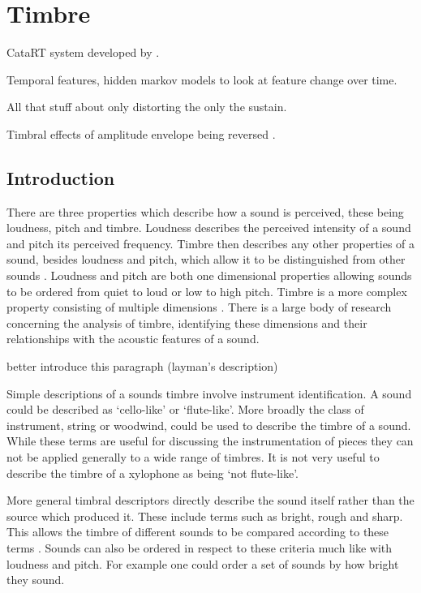 
\chapter{Timbre}
\label{chap:Timbre}
\note
{
	CataRT system developed by \citet{schwarz2007corpus}.

	Temporal features, hidden markov models to look at feature change over time. 

	All that stuff about only distorting the only the sustain.

	Timbral effects of amplitude envelope being reversed \citep{patterson1994the}.

}

\section{Introduction}
\label{sec:Timbre-Introduction}
	There are three properties which describe how a sound is perceived, these being loudness, pitch and timbre. Loudness
	describes the perceived intensity of a sound and pitch its perceived frequency. Timbre then describes any other
	properties of a sound, besides loudness and pitch, which allow it to be distinguished from other sounds
	\citep{mathews1999introduction}. Loudness and pitch are both one dimensional properties allowing sounds to be
	ordered from quiet to loud or low to high pitch. Timbre is a more complex property consisting of multiple dimensions
	\citep{rossing2002the}. There is a large body of research concerning the analysis of timbre, identifying these
	dimensions and their relationships with the acoustic features of a sound.

	\note
	{
		better introduce this paragraph (layman's description)
	}

	Simple descriptions of a sounds timbre involve instrument identification. A sound could be described as `cello-like'
	or `flute-like'. More broadly the class of instrument, string or woodwind, could be used to describe the timbre of a
	sound. While these terms are useful for discussing the instrumentation of pieces they can not be applied generally
	to a wide range of timbres. It is not very useful to describe the timbre of a xylophone as being `not flute-like'.

	More general timbral descriptors directly describe the sound itself rather than the source which produced it. These
	include terms such as bright, rough and sharp. This allows the timbre of different sounds to be compared according
	to these terms \citep{howard2009acoustics}. Sounds can also be ordered in respect to these criteria much like with
	loudness and pitch. For example one could order a set of sounds by how bright they sound.

